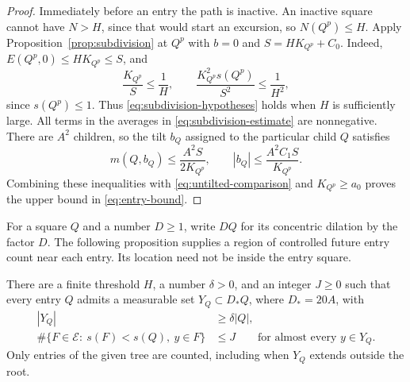 \begin{proof}
Immediately before an entry the path is inactive. An inactive square
cannot have $N>H$, since that would start an excursion, so
$N(Q^p)\le H$. Apply Proposition~\ref{prop:subdivision} at $Q^p$ with
$b=0$ and $S=HK_{Q^p}+C_0$. Indeed, $E(Q^p,0)\le HK_{Q^p}\le S$, and
\[
 \frac{K_{Q^p}}{S}\le\frac1H,
 \qquad
 \frac{K_{Q^p}^2s(Q^p)}{S^2}\le\frac1{H^2},
\]
since $s(Q^p)\le1$. Thus
\eqref{eq:subdivision-hypotheses} holds when $H$ is sufficiently large.
All terms in the averages in \eqref{eq:subdivision-estimate} are
nonnegative. There are $A^2$ children, so the tilt $b_Q$ assigned to the
particular child $Q$ satisfies
\[
 m(Q,b_Q)\le \frac{A^2S}{2K_{Q^p}},
 \qquad
 |b_Q|\le \frac{A^2C_1S}{K_{Q^p}}.
\]
Combining these inequalities with
\eqref{eq:untilted-comparison} and $K_{Q^p}\ge a_0$ proves the upper
bound in \eqref{eq:entry-bound}.
\end{proof}

For a square $Q$ and a number $D\ge1$, write $DQ$ for its concentric
dilation by the factor $D$. The following proposition supplies a region
of controlled future entry count near each entry. Its location need not
be inside the entry square.

\begin{proposition}
\label{prop:persistence}
There are a finite threshold $H$, a number $\delta>0$, and an integer
$J\ge0$ such that every entry $Q$ admits a measurable set
$Y_Q\subset D_*Q$, where $D_*=20A$, with
\begin{equation}
\label{eq:persistence}
 \begin{split}
 |Y_Q|&\ge\delta|Q|,\\
 \#\{F\in\mathcal E:\ s(F)<s(Q),\ y\in F\}&\le J
 \qquad\text{for almost every }y\in Y_Q.
 \end{split}
\end{equation}
Only entries of the given tree are counted, including when $Y_Q$
extends outside the root.
\end{proposition}

